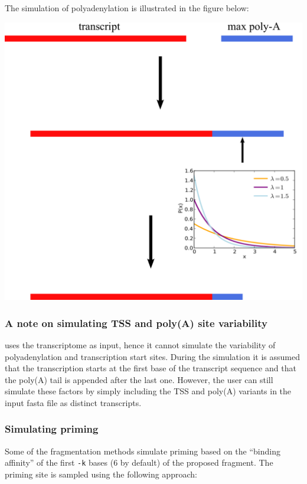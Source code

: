 The simulation of polyadenylation is illustrated in the figure below:

\begin{center}
\includegraphics[scale=0.6]{pix/polya_simulation.pdf}
\end{center}

\subsubsection{A note on simulating TSS and poly(A) site variability}
\label{sss:tss_pa_varsim}

\rlsim uses the transcriptome as input, hence it cannot simulate the variability of polyadenylation and transcription start sites.
During the simulation it is assumed that the transcription starts at the first base of the transcript sequence and that the poly(A) tail is appended after
the last one. However, the user can still simulate these factors by simply including the TSS and poly(A) variants in the input fasta file as distinct transcripts.

\subsubsection{Simulating priming}
\label{sss:priming_sim}

Some of the fragmentation methods simulate priming based on the ``binding affinity'' of the first \texttt{-k} bases (6 by default) of the proposed fragment. The priming site is sampled using the following approach:

